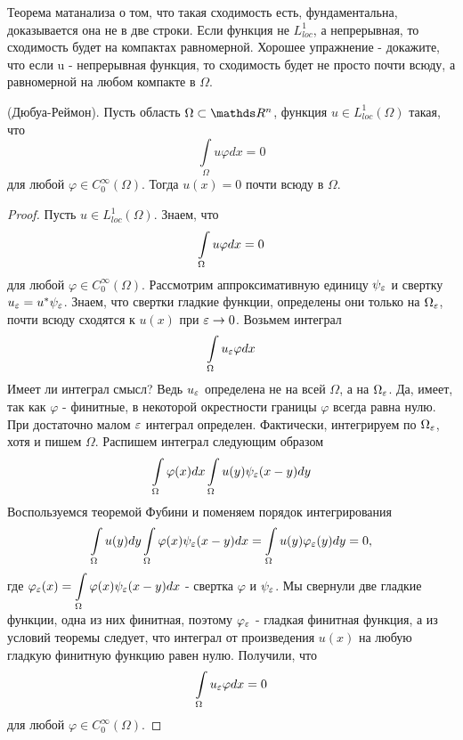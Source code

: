 Теорема матанализа о том, что такая сходимость есть, фундаментальна, доказывается она не в две строки. 
Если функция не $L_{loc}^1$, а непрерывная, то сходимость будет на компактах равномерной. Хорошее упражнение - докажите, что если u - непрерывная функция, то сходимость будет не просто почти всюду, а равномерной на любом компакте в $\Omega$.

\begin{lemma}{(Дюбуа-Реймон).}
Пусть область $\Omega \subset \real^n$, функция $u \in L_{loc}^1(\Omega)$ такая, что 
$$\int \limits_{\Omega} u \varphi dx = 0$$ 
для любой $\varphi \in C_0^\infty(\Omega)$. Тогда $u(x) = 0$ почти всюду в $\Omega$.
\end{lemma}

\begin{proof}
Пусть $u \in L_{loc}^1(\Omega)$. Знаем, что
$$\int \limits_{\Omega} u \varphi dx = 0$$
для любой $\varphi \in C_0^{\infty}(\Omega)$.
Рассмотрим аппроксимативную единицу $\psi_{\varepsilon}$ и свертку $u_{\varepsilon} = u^* \psi_{\varepsilon}$. 
Знаем, что свертки гладкие функции, определены они только на $\Omega_{\varepsilon}$, почти всюду сходятся к $u(x)$ при $\varepsilon \rightarrow 0$. 
Возьмем интеграл 
$$\int \limits_{\Omega} u_{\varepsilon} \varphi dx$$
Имеет ли интеграл смысл? Ведь $u_{\varepsilon}$ определена не на всей $\Omega$, а на $\Omega_{\varepsilon}$. Да, имеет, так как $\varphi$ - финитные, в некоторой окрестности границы $\varphi$ всегда равна нулю. При достаточно малом $\varepsilon$ интеграл определен. Фактически, интегрируем по $\Omega_{\varepsilon}$, хотя и пишем $\Omega$. 
Распишем интеграл следующим образом
$$ \int \limits_{\Omega} \varphi(x) dx \int \limits_{\Omega} u(y) \psi_{\varepsilon}(x - y) dy$$
Воспользуемся теоремой Фубини и поменяем порядок интегрирования
$$ \int \limits_{\Omega} u(y) dy \int \limits_{\Omega} \varphi(x) \psi_{\varepsilon}(x - y) dx = \int \limits_{\Omega} u(y) \varphi_{\varepsilon}(y) dy = 0,$$
где $\varphi_{\varepsilon}(x) = \displaystyle \int \limits_{\Omega} \varphi(x) \psi_{\varepsilon}(x - y) dx$ - свертка $\varphi$ и $\psi_{\varepsilon}$. 
Мы свернули две гладкие функции, одна из них финитная, поэтому $\varphi_{\varepsilon}$ - гладкая финитная функция, а из условий теоремы следует, что интеграл от произведения $u(x)$ на любую гладкую финитную функцию равен нулю.
Получили, что 
$$\int \limits_{\Omega} u_{\varepsilon} \varphi dx = 0$$
для любой $\varphi \in C_0^{\infty}(\Omega)$.


\end{proof}
